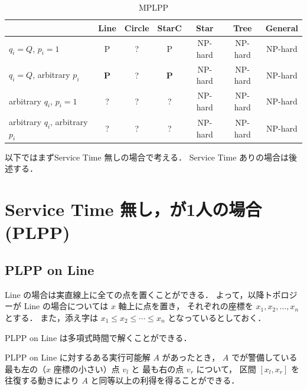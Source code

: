 \begin{table}[htbp]
	\centering
	\caption{MPLPP\label{tab:MPLPP}}
	\begin{tabular}{|l|c|c|c|c|c|c|}
	\hline
	 & Line & Circle & StarC & Star & Tree & General \\
	 \hline
	$q_i = Q$,       $p_i = 1$       
		& P & ? & P & NP-hard & NP-hard & NP-hard \\
	\hline
	$q_i = Q$,       arbitrary $p_i$ 
		& {\bf P} & ? & {\bf P} & NP-hard & NP-hard & NP-hard \\
	\hline
	arbitrary $q_i$, $p_i = 1$       
		& ? & ? & ? & NP-hard & NP-hard & NP-hard \\
	\hline
	arbitrary $q_i$, arbitrary $p_i$ 
		& ? & ? & ? & NP-hard & NP-hard & NP-hard \\
	\hline
	\end{tabular}
\end{table}




以下ではまずService Time 無しの場合で考える．
Service Time ありの場合は後述する．




\section{Service Time 無し，\server が1人の場合(PLPP)}


\subsection{PLPP on Line}

Line の場合は実直線上に全ての点を置くことができる．
よって，以降トポロジーが Line の場合については $x$ 軸上に点を置き，
それぞれの座標を $x_1, x_2, \ldots, x_n$ とする．
また，添え字は $x_1 \leq x_2 \leq \cdots \leq x_n$ となっているとしておく．

\begin{theo}
PLPP on Line は多項式時間で解くことができる．
\label{theo:PLPPonLine_1}
\end{theo}

\begin{lemm}
	PLPP on Line に対するある実行可能解 $A$ があったとき，
	$A$ で\server が警備している最も左の（$x$ 座標の小さい）点 $v_l$ と
	最も右の点 $v_r$ について，
	区間 $[x_l, x_r]$ を往復する動きにより $A$ と同等以上の利得を得ることができる．
\end{lemm}

